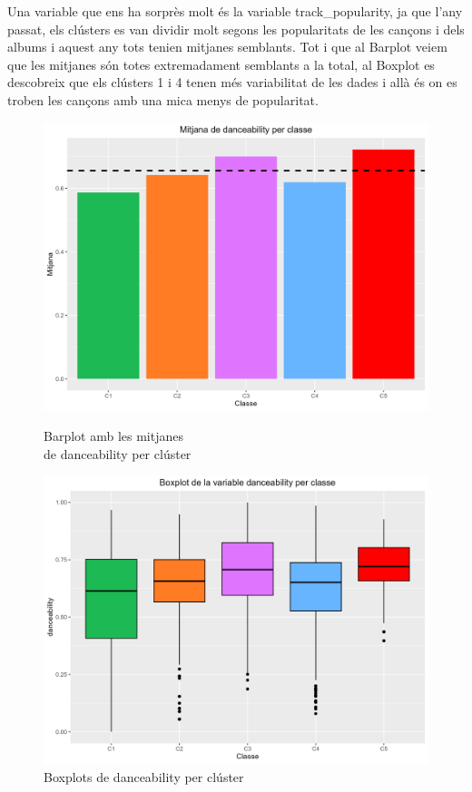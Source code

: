 Una variable que ens ha sorprès molt és la variable track\_popularity, ja que l'any passat, els clústers es van dividir molt segons les popularitats de les cançons i dels albums i aquest any tots tenien mitjanes semblants. Tot i que al Barplot veiem que les mitjanes són totes extremadament semblants a la total, al Boxplot es descobreix que els clústers 1 i 4 tenen més variabilitat de les dades i allà és on es troben les cançons amb una mica menys de popularitat. 

\begin{figure}[H]
\centering
    \begin{minipage}{.49\textwidth}
        \centering
        \includegraphics[width=0.95\linewidth]{Images/5_Profiling/numeriques/Num_BarPlot_danceability.png}
        \caption{Barplot amb les mitjanes \\ de danceability per clúster}
        \label{fig:Num_BarPlot_danceability}
    \end{minipage}%
    \begin{minipage}{.49\textwidth}
        \centering
        \includegraphics[width=0.95\linewidth]{Images/5_Profiling/numeriques/Num_BoxPlot_danceability.png}
        \caption{Boxplots de danceability per clúster}
        \label{fig:Num_BoxPlot_danceability}
    \end{minipage}%
\end{figure}
